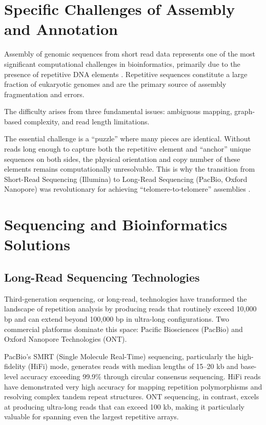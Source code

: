 \section{Specific Challenges of Assembly and Annotation}

Assembly of genomic sequences from short read data represents one of the most significant computational challenges in bioinformatics, primarily due to the presence of repetitive DNA elements \parencite{treangen2011,phillippy2008,chaisson2015}. Repetitive sequences constitute a large fraction of eukaryotic genomes and are the primary source of assembly fragmentation and errors.

The difficulty arises from three fundamental issues: ambiguous mapping, graph-based complexity, and read length limitations.

The essential challenge is a ``puzzle'' where many pieces are identical. Without reads long enough to capture both the repetitive element and ``anchor'' unique sequences on both sides, the physical orientation and copy number of these elements remains computationally unresolvable. This is why the transition from Short-Read Sequencing (Illumina) to Long-Read Sequencing (PacBio, Oxford Nanopore) was revolutionary for achieving ``telomere-to-telomere'' assemblies \parencite{logsdon2020}.

\section{Sequencing and Bioinformatics Solutions}

\subsection{Long-Read Sequencing Technologies}

Third-generation sequencing, or long-read, technologies have transformed the landscape of repetition analysis by producing reads that routinely exceed 10,000 bp and can extend beyond 100,000 bp in ultra-long configurations. Two commercial platforms dominate this space: Pacific Biosciences (PacBio) and Oxford Nanopore Technologies (ONT).

PacBio's SMRT (Single Molecule Real-Time) sequencing, particularly the high-fidelity (HiFi) mode, generates reads with median lengths of 15--20 kb and base-level accuracy exceeding 99.9\% through circular consensus sequencing. HiFi reads have demonstrated very high accuracy for mapping repetition polymorphisms and resolving complex tandem repeat structures. ONT sequencing, in contrast, excels at producing ultra-long reads that can exceed 100 kb, making it particularly valuable for spanning even the largest repetitive arrays.

